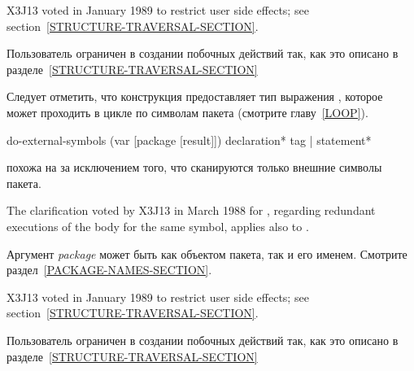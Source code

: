 \begin{defmac}
\begin{new}
X3J13 voted in January 1989
to restrict user side effects; see section~\ref{STRUCTURE-TRAVERSAL-SECTION}.
\end{new}

Пользователь ограничен в создании побочных действий так, как это описано в
разделе~\ref{STRUCTURE-TRAVERSAL-SECTION}

Следует отметить, что конструкция  предоставляет тип выражения
, которое может проходить в цикле по символам пакета (смотрите главу~\ref{LOOP}).
\end{defmac}

\begin{defmac}
do-external-symbols (var [package [result]])
                    {declaration}* {tag | statement}*

 похожа на  за исключением того, что
сканируются только внешние символы пакета.

\begin{new}
The clarification voted by X3J13
in March 1988 for 
,
regarding redundant executions of the body for the same symbol,
applies also to .
\end{new}

Аргумент \emph{package} может быть как объектом пакета, так и его
именем. Смотрите раздел~\ref{PACKAGE-NAMES-SECTION}.

\begin{new}
X3J13 voted in January 1989
to restrict user side effects; see section~\ref{STRUCTURE-TRAVERSAL-SECTION}.
\end{new}

Пользователь ограничен в создании побочных действий так, как это описано в
разделе~\ref{STRUCTURE-TRAVERSAL-SECTION}
\end{defmac}

